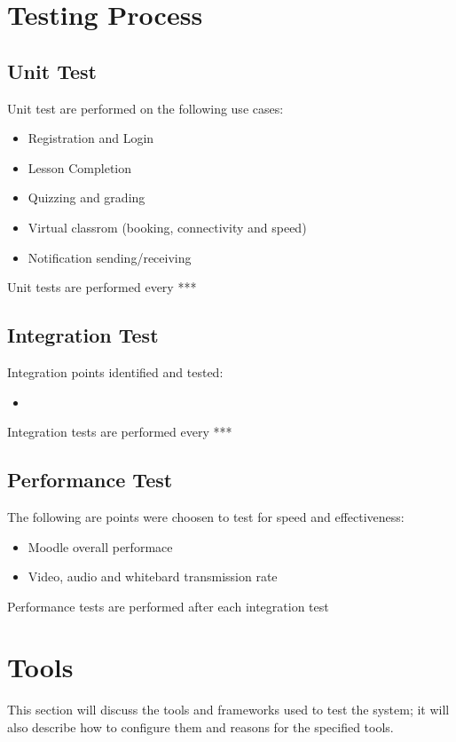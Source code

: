 \documentclass[12pt,a4paper]{article}
\begin{document}
	\section*{Testing Process} %
		\subsection*{Unit Test}
		Unit test are performed on the following use cases:
		\begin{itemize}
			\item Registration  and Login
			\item Lesson Completion
			\item Quizzing and grading
			\item Virtual classrom (booking, connectivity and speed)
			\item Notification sending/receiving
		\end{itemize}
		
		\newline 
		Unit tests are performed every ***
		
		\subsection*{Integration Test}
		Integration points identified and tested:
		\begin{itemize}
			\item
		\end{itemize}
		Integration tests are performed every ***
		
		\subsection*{Performance Test}
		The following are points were choosen to test for speed  and effectiveness:
		\begin{itemize}
			\item Moodle overall performace
			\item Video, audio and whitebard transmission rate 
		\end{itemize}
		\newline
		Performance tests are performed after each integration test
		
	\section*{Tools} %
		This section will discuss the tools and frameworks used to test the system; it will also describe how to configure them and reasons for the specified tools.
\end{document}

